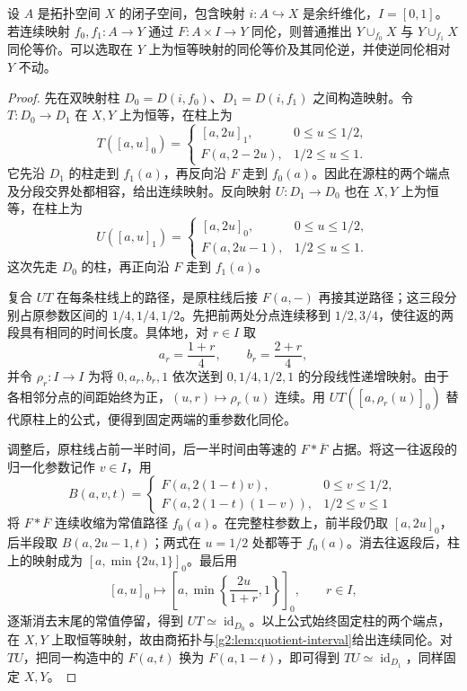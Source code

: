 \begin{proposition}\label{g2:prop:homotopic-attaching-maps}
	设 \(A\) 是拓扑空间 \(X\) 的闭子空间，包含映射 \(i:A\hookrightarrow X\) 是余纤维化，\(I=[0,1]\)。若连续映射 \(f_0,f_1:A\to Y\) 通过 \(F:A\times I\to Y\) 同伦，则普通推出 \(Y\cup_{f_0}X\) 与 \(Y\cup_{f_1}X\) 同伦等价。可以选取在 \(Y\) 上为恒等映射的同伦等价及其同伦逆，并使逆同伦相对 \(Y\) 不动。
\end{proposition}
\begin{proof}
	先在双映射柱 \(D_0=D(i,f_0)\)、\(D_1=D(i,f_1)\) 之间构造映射。令 \(T:D_0\to D_1\) 在 \(X,Y\) 上为恒等，在柱上为
	\[
		T([a,u]_0)=
		\begin{cases}
			[a,2u]_1,&0\le u\le1/2,\\
			F(a,2-2u),&1/2\le u\le1.
		\end{cases}
	\]
	它先沿 \(D_1\) 的柱走到 \(f_1(a)\)，再反向沿 \(F\) 走到 \(f_0(a)\)。因此在源柱的两个端点及分段交界处都相容，给出连续映射。反向映射 \(U:D_1\to D_0\) 也在 \(X,Y\) 上为恒等，在柱上为
	\[
		U([a,u]_1)=
		\begin{cases}
			[a,2u]_0,&0\le u\le1/2,\\
			F(a,2u-1),&1/2\le u\le1.
		\end{cases}
	\]
	这次先走 \(D_0\) 的柱，再正向沿 \(F\) 走到 \(f_1(a)\)。

	复合 \(UT\) 在每条柱线上的路径，是原柱线后接 \(F(a,-)\) 再接其逆路径；这三段分别占原参数区间的 \(1/4,1/4,1/2\)。先把前两处分点连续移到 \(1/2,3/4\)，使往返的两段具有相同的时间长度。具体地，对 \(r\in I\) 取
	\[
		a_r=\frac{1+r}{4},\qquad b_r=\frac{2+r}{4},
	\]
	并令 \(\rho_r:I\to I\) 为将 \(0,a_r,b_r,1\) 依次送到 \(0,1/4,1/2,1\) 的分段线性递增映射。由于各相邻分点的间距始终为正，\((u,r)\mapsto\rho_r(u)\) 连续。用 \(UT([a,\rho_r(u)]_0)\) 替代原柱上的公式，便得到固定两端的重参数化同伦。

	调整后，原柱线占前一半时间，后一半时间由等速的 \(F*\overline F\) 占据。将这一往返段的归一化参数记作 \(v\in I\)，用
	\[
		B(a,v,t)=
		\begin{cases}
			F(a,2(1-t)v),&0\le v\le1/2,\\
			F(a,2(1-t)(1-v)),&1/2\le v\le1
		\end{cases}
	\]
	将 \(F*\overline F\) 连续收缩为常值路径 \(f_0(a)\)。在完整柱参数上，前半段仍取 \([a,2u]_0\)，后半段取 \(B(a,2u-1,t)\)；两式在 \(u=1/2\) 处都等于 \(f_0(a)\)。消去往返段后，柱上的映射成为 \([a,\min\{2u,1\}]_0\)。最后用
	\[
		[a,u]_0\longmapsto
		\left[a,\min\left\{\frac{2u}{1+r},1\right\}\right]_0,
		\qquad r\in I,
	\]
	逐渐消去末尾的常值停留，得到 \(UT\simeq\operatorname{id}_{D_0}\)。以上公式始终固定柱的两个端点，在 \(X,Y\) 上取恒等映射，故由商拓扑与\cref{g2:lem:quotient-interval}给出连续同伦。对 \(TU\)，把同一构造中的 \(F(a,t)\) 换为 \(F(a,1-t)\)，即可得到 \(TU\simeq\operatorname{id}_{D_1}\)，同样固定 \(X,Y\)。


\end{proof}
